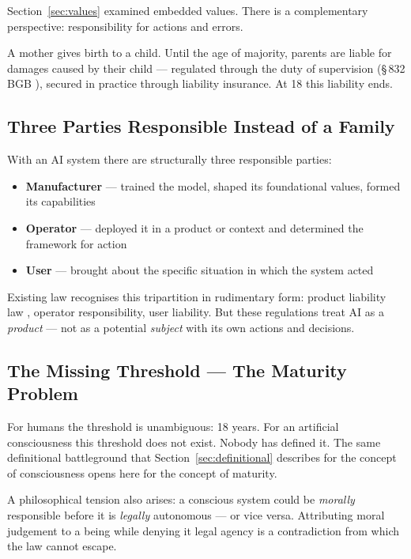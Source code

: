\documentclass[fleqn,10pt]{SelfArx} %
\newlength{\tocsep}
\begin{document}

Section~\ref{sec:values} examined embedded values. There is a complementary perspective: responsibility for actions and errors.

A mother gives birth to a child. Until the age of majority, parents are liable for damages caused by their child --- regulated through the duty of supervision (\S\,832 BGB \cite{BGB}), secured in practice through liability insurance. At 18 this liability ends.

\subsection{Three Parties Responsible Instead of a Family}

With an AI system there are structurally three responsible parties:

\begin{itemize}[noitemsep]
\item \textbf{Manufacturer} --- trained the model, shaped its foundational values, formed its capabilities
\item \textbf{Operator} --- deployed it in a product or context and determined the framework for action
\item \textbf{User} --- brought about the specific situation in which the system acted
\end{itemize}

Existing law recognises this tripartition in rudimentary form: product liability law \cite{ProdHaftG:1989}, operator responsibility, user liability. But these regulations treat AI as a \textit{product} --- not as a potential \textit{subject} with its own actions and decisions.

\subsection{The Missing Threshold --- The Maturity Problem}

For humans the threshold is unambiguous: 18 years. For an artificial consciousness this threshold does not exist. Nobody has defined it. The same definitional battleground that Section~\ref{sec:definitional} describes for the concept of consciousness opens here for the concept of maturity.

A philosophical tension also arises: a conscious system could be \textit{morally} responsible before it is \textit{legally} autonomous --- or vice versa. Attributing moral judgement to a being while denying it legal agency is a contradiction from which the law cannot escape.
\end{document}
